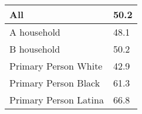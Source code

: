  
\begin{tabular}{ll}
\hline
All                     & 50.2 \\ \hline
A   household & 48.1 \\
B   household   & 50.2 \\
Primary   Person White  & 42.9 \\
Primary   Person Black  & 61.3 \\
Primary   Person Latina & 66.8 \\ \hline
\end{tabular} 